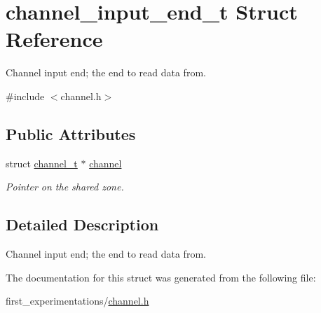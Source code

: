 \hypertarget{structchannel__input__end__t}{\section{channel\-\_\-input\-\_\-end\-\_\-t Struct Reference}
\label{structchannel__input__end__t}
}


Channel input end; the end to read data from.  




{\ttfamily \#include $<$channel.\-h$>$}

\subsection*{Public Attributes}
\begin{DoxyCompactItemize}
\item 
\hypertarget{structchannel__input__end__t_aa63c7db8c6475654ea086c7ff8065107}{struct \hyperlink{structchannel__t}{channel\-\_\-t} $\ast$ \hyperlink{structchannel__input__end__t_aa63c7db8c6475654ea086c7ff8065107}{channel}}\label{structchannel__input__end__t_aa63c7db8c6475654ea086c7ff8065107}

\begin{DoxyCompactList}\small\item\em Pointer on the shared zone. \end{DoxyCompactList}\end{DoxyCompactItemize}


\subsection{Detailed Description}
Channel input end; the end to read data from. 

The documentation for this struct was generated from the following file\-:\begin{DoxyCompactItemize}
\item 
first\-\_\-experimentations/\hyperlink{channel_8h}{channel.\-h}\end{DoxyCompactItemize}
